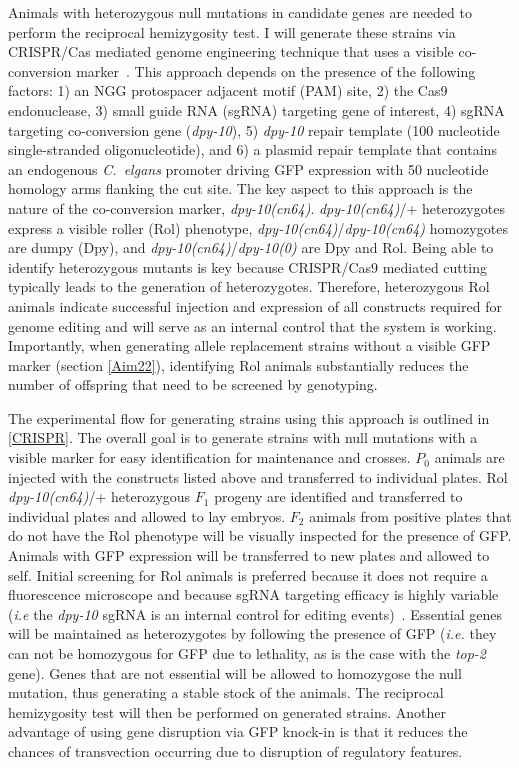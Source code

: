 \documentclass[12pt]{article}
\begin{document}
Animals with heterozygous null mutations in candidate genes are needed to perform the reciprocal hemizygosity test. I will generate these strains via CRISPR/Cas mediated genome engineering technique that uses a visible co-conversion marker~\cite{Arribere:2014ku}. This approach depends on the presence of the following factors: 1) an NGG protospacer adjacent motif (PAM) site, 2) the Cas9 endonuclease, 3) small guide RNA (sgRNA) targeting gene of interest, 4) sgRNA targeting co-conversion gene ({\it dpy-10}), 5) {\it dpy-10} repair template (100 nucleotide single-stranded oligonucleotide), and 6) a plasmid repair template that contains an endogenous {\it C.~elgans} promoter driving GFP expression with 50 nucleotide homology arms flanking the cut site. The key aspect to this approach is the nature of the co-conversion marker, {\it dpy-10(cn64)}. {\it dpy-10(cn64)}/+ heterozygotes express a visible roller (Rol) phenotype, {\it dpy-10(cn64)}/{\it dpy-10(cn64)} homozygotes are dumpy (Dpy), and {\it dpy-10(cn64)}/{\it dpy-10(0)} are Dpy and Rol. Being able to identify heterozygous mutants is key because CRISPR/Cas9 mediated cutting typically leads to the generation of heterozygotes. Therefore, heterozygous Rol animals indicate successful injection and expression of all constructs required for genome editing and will serve as an internal control that the system is working. Importantly, when generating allele replacement strains without a visible GFP marker (section \ref{Aim22}), identifying Rol animals substantially reduces the number of offspring that need to be screened by genotyping.
\vspace{5pt}

The experimental flow for generating strains using this approach is outlined in \autoref{CRISPR}. The overall goal is to generate strains with null mutations with a visible marker for easy identification for maintenance and crosses. $P_{0}$ animals are injected with the constructs listed above and transferred to individual plates. Rol {\it dpy-10(cn64)}/+ heterozygous $F_{1}$ progeny are identified and transferred to individual plates and allowed to lay embryos. $F_{2}$ animals from positive plates that do not have the Rol phenotype will be visually inspected for the presence of GFP. Animals with GFP expression will be transferred to new plates and allowed to self. Initial screening for Rol animals is preferred because it does not require a fluorescence microscope and because sgRNA targeting efficacy is highly variable ({\it i.e} the {\it dpy-10} sgRNA is an internal control for editing events)~\cite{Arribere:2014ku}. Essential genes will be maintained as heterozygotes by following the presence of GFP ({\it i.e.} they can not be homozygous for GFP due to lethality, as is the case with the {\it top-2} gene). Genes that are not essential will be allowed to homozygose the null mutation, thus generating a stable stock of the animals. The reciprocal hemizygosity test will then be performed on generated strains. Another advantage of using gene disruption via GFP knock-in is that it reduces the chances of transvection occurring due to disruption of regulatory features. 
\vspace{5pt}
\end{document}
